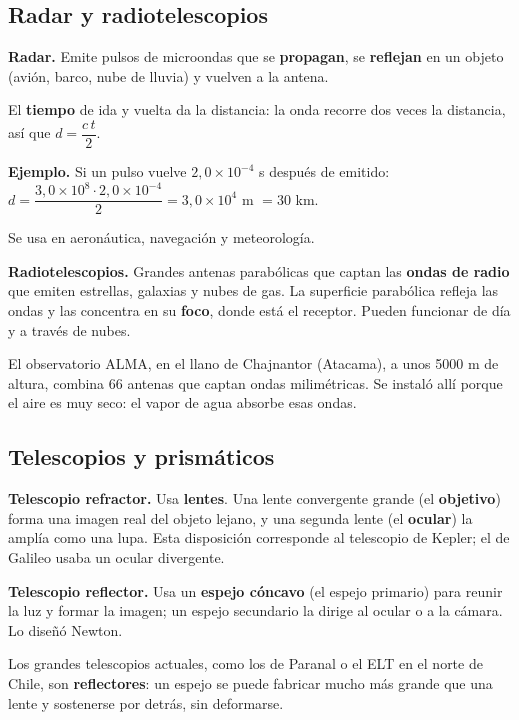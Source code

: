 \subsection{Radar y radiotelescopios}
\textbf{Radar.} Emite pulsos de microondas que se \textbf{propagan}, se \textbf{reflejan} en un objeto (avión, barco, nube de lluvia) y vuelven a la antena.

 

El \textbf{tiempo} de ida y vuelta da la distancia: la onda recorre dos veces la distancia, así que $d = \dfrac{c\,t}{2}$.

 

\textbf{Ejemplo.} Si un pulso vuelve $2{,}0\times10^{-4}$ s después de emitido: $d = \dfrac{3{,}0\times10^{8}\cdot 2{,}0\times10^{-4}}{2} = 3{,}0\times10^{4}$ m $= 30$ km.

 

Se usa en aeronáutica, navegación y meteorología.

  

\textbf{Radiotelescopios.} Grandes antenas parabólicas que captan las \textbf{ondas de radio} que emiten estrellas, galaxias y nubes de gas. La superficie parabólica refleja las ondas y las concentra en su \textbf{foco}, donde está el receptor. Pueden funcionar de día y a través de nubes.

 
\begin{clave} El observatorio ALMA, en el llano de Chajnantor (Atacama), a unos 5000 m de altura, combina 66 antenas que captan ondas milimétricas. Se instaló allí porque el aire es muy seco: el vapor de agua absorbe esas ondas.\end{clave}
\subsection{Telescopios y prismáticos}
\textbf{Telescopio refractor.} Usa \textbf{lentes}. Una lente convergente grande (el \textbf{objetivo}) forma una imagen real del objeto lejano, y una segunda lente (el \textbf{ocular}) la amplía como una lupa. Esta disposición corresponde al telescopio de Kepler; el de Galileo usaba un ocular divergente.

 

\textbf{Telescopio reflector.} Usa un \textbf{espejo cóncavo} (el espejo primario) para reunir la luz y formar la imagen; un espejo secundario la dirige al ocular o a la cámara. Lo diseñó Newton.

 

Los grandes telescopios actuales, como los de Paranal o el ELT en el norte de Chile, son \textbf{reflectores}: un espejo se puede fabricar mucho más grande que una lente y sostenerse por detrás, sin deformarse.


